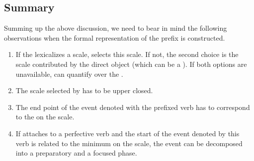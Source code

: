\subsection{Summary}
Summing up the above discussion, we need to bear in mind the following observations when the formal representation of the prefix  is constructed.
\begin{enumerate}
\item If the  lexicalizes a scale,  selects this scale. If not, the second choice is the scale contributed by the direct object (which can be a ). If both options are unavailable,  can quantify over the .
\item The scale selected by  has to be upper closed.
\item The end point of the event denoted with the prefixed verb has to correspond to the  on the scale.
\item If  attaches to a perfective verb and the start of the event denoted by this verb is related to the minimum on the scale, the event can be decomposed into a preparatory and a focused phase.
\end{enumerate}

